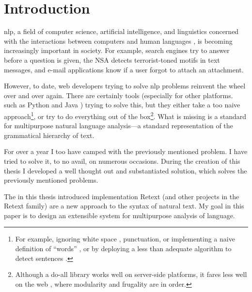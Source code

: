 
\begingroup
\let\clearpage\relax
\let\cleardoublepage\relax
\let\cleardoublepage\relax

\chapter*{Introduction}

\Gls{nlp}, a field of computer science, artificial intelligence, and
linguistics concerned with the interactions between computers and human
languages \autocite[see][]{wikipedia-natural-language-processing}, is
becoming increasingly important in society. For example, search engines
try to answer before a question is given, the NSA detects
terrorist-toned motifs in text messages, and e-mail applications know if
a user forgot to attach an attachment.

However, to date, web developers trying to solve \gls{nlp} problems
reinvent the wheel over and over again. There are certainly tools
(especially for other platforms. such as Python
\autocite[see][]{nltk-source} and Java \autocite[see][]{opennlp-source})
trying to solve this, but they either take a too naive
approach\footnote{For example, ignoring white space
  \autocite[See][]{loadfive/knwl-source-code}, punctuation, or
  implementing a naive definition of ``words'' \autocite[such
  as][]{nhunzaker/speakeasy-source-code}, or by deploying a less than
  adequate algorithm to detect sentences \autocite[such
  as][]{nytimes/emphasis-source-code}.}, or try to do everything out of
the box\footnote{Although a do-all library works well on server-side
  platforms, it fares less well on the web \autocite[such
  as][]{NaturalNode/natural-source-code}, where modularity and frugality
  are in order.}. What is missing is a standard for multipurpose natural
language analysis---a standard representation of the grammatical
hierarchy of text.

For over a year I too have camped with the previously mentioned problem.
I have tried to solve it, to no avail, on numerous occasions. During the
creation of this thesis I developed a well thought out and substantiated
solution, which solves the previously mentioned problems.

The in this thesis introduced implementation Retext (and other projects
in the Retext family) are a new approach to the syntax of natural text.
My goal in this paper is to design an extensible system for multipurpose
analysis of language.

